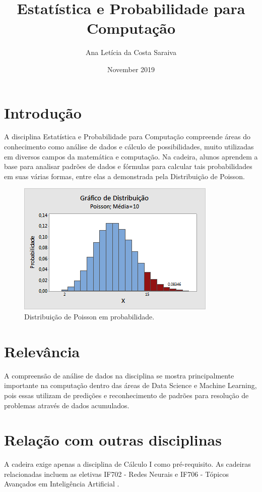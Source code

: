\documentclass[10pt]{article}
\title{Estatística e Probabilidade para Computação}
\author{Ana Letícia da Costa Saraiva}
\date{November 2019}
\begin{document}
\maketitle

\section{Introdução}
A disciplina Estatística e Probabilidade para Computação compreende áreas do conhecimento como análise de dados e cálculo de possibilidades, muito utilizadas em diversos campos da matemática e computação. Na cadeira, alunos aprendem a base para analisar padrões de dados e fórmulas para calcular tais probabilidades em suas várias formas, entre elas a demonstrada pela Distribuição de Poisson.\cite{sitedisciplina}

\begin{figure}[h!]
\centering
\includegraphics[scale=0.9]{distribuicao_poisson.png}
\caption{Distribuição de Poisson em probabilidade. \citep{grafico}}
\label{fig:Análise de Dados}
\end{figure}

\section{Relevância}
A compreensão de análise de dados na disciplina se mostra principalmente importante na computação dentro das áreas de Data Science e Machine Learning, pois essas utilizam de predições e reconhecimento de padrões para resolução de problemas através de dados acumulados.\cite{ML}


\section{Relação com outras disciplinas}
A cadeira exige apenas a disciplina de Cálculo I como pré-requisito. As cadeiras relacionadas incluem as eletivas IF702 - Redes Neurais e IF706 - Tópicos Avançados em Inteligência Artificial .
\cite{siteeletivas}


\end{document}
